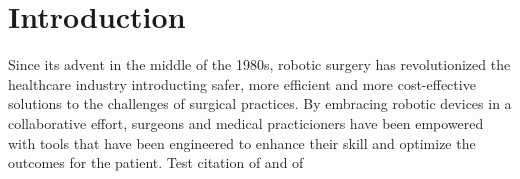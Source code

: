 \documentclass[../main.tex]{subfiles}
\begin{document}
\section{Introduction}
Since its advent in the middle of the 1980s, robotic surgery has revolutionized the healthcare industry introducting safer, more efficient and more cost-effective solutions to the challenges of surgical practices. By embracing robotic devices in a collaborative effort, surgeons and medical practicioners have been empowered with tools that have been engineered to enhance their skill and optimize the outcomes for the patient. 
Test citation of \cite{Enayati2016} and of \cite{Bettini2004}



\end{document}
